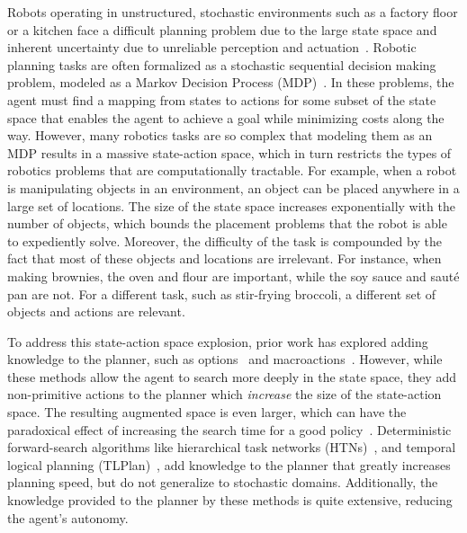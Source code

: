 \documentclass[letterpaper]{article}
\begin{document}
Robots operating in unstructured, stochastic environments such as a
factory floor or a kitchen face a difficult planning problem due to
the large state space and inherent uncertainty due to unreliable
perception and actuation~\citep{bollini12,knepper13}.  Robotic
planning tasks are often formalized as a stochastic sequential
decision making problem, modeled as a Markov Decision Process
(MDP)~\citep{thrun2008probabilistic}. In these problems, the agent
must find a mapping from states to actions for some subset of the
state space that enables the agent to achieve a goal while minimizing
costs along the way. However, many robotics tasks are so complex that
modeling them as an MDP results in a massive state-action space, which
in turn restricts the types of robotics problems that are
computationally tractable. For example, when a robot is manipulating
objects in an environment, an object can be placed anywhere in a large
set of locations. The size of the state space increases exponentially
with the number of objects, which bounds the placement problems that
the robot is able to expediently solve. Moreover, the difficulty of the task is compounded
by the fact that most of these objects and locations are irrelevant. For instance, when making brownies,
the oven and flour are important, while the soy sauce and saut\'{e}
pan are not.  For a different task, such as stir-frying broccoli, a
different set of objects and actions are relevant.

To address this state-action space explosion, prior work has explored
adding knowledge to the planner, such as options~\cite{sutton99} and
macroactions~\cite{Botea:2005kx,Newton:2005vn}.  However, while these
methods allow the agent to search more deeply in the state space, they
add non-primitive actions to the planner which {\em increase} the size of
the state-action space.  The resulting augmented space is even larger,
which can have the paradoxical effect of increasing the search time
for a good policy~\cite{Jong:2008zr}.  
Deterministic forward-search algorithms like hierarchical task
networks (HTNs)~\citep{Nau:1999:SSH:1624312.1624357}, and temporal
logical planning (TLPlan)~\citep{Bacchus95usingtemporal,Bacchus99usingtemporal},
add knowledge to the planner that greatly increases planning speed, but do
not generalize to stochastic domains. Additionally, the knowledge
provided to the planner by these methods is quite extensive, reducing the
agent's autonomy.
\end{document}
